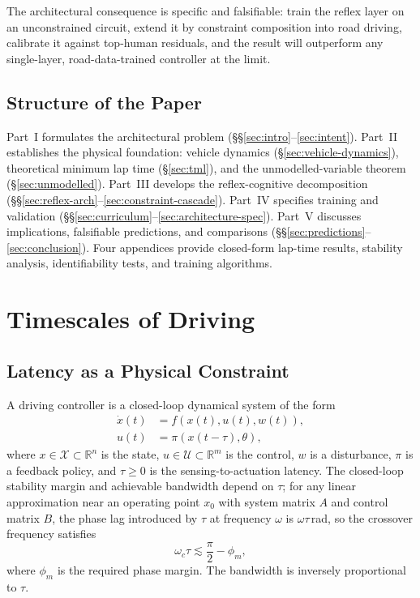 \documentclass[11pt,twocolumn]{article}
\theoremstyle{definition}
\theoremstyle{remark}
\newcommand{\R}{\mathbb{R}}
\providecommand{\cU}{\mathcal{U}}
\providecommand{\cX}{\mathcal{X}}
\begin{document}
\noindent The architectural consequence is specific and falsifiable: train the reflex layer on an unconstrained circuit, extend it by constraint composition into road driving, calibrate it against top-human residuals, and the result will outperform any single-layer, road-data-trained controller at the limit.

\subsection{Structure of the Paper}

Part~I formulates the architectural problem (\S\S\ref{sec:intro}--\ref{sec:intent}). Part~II establishes the physical foundation: vehicle dynamics (\S\ref{sec:vehicle-dynamics}), theoretical minimum lap time (\S\ref{sec:tml}), and the unmodelled-variable theorem (\S\ref{sec:unmodelled}). Part~III develops the reflex-cognitive decomposition (\S\S\ref{sec:reflex-arch}--\ref{sec:constraint-cascade}). Part~IV specifies training and validation (\S\S\ref{sec:curriculum}--\ref{sec:architecture-spec}). Part~V discusses implications, falsifiable predictions, and comparisons (\S\S\ref{sec:predictions}--\ref{sec:conclusion}). Four appendices provide closed-form lap-time results, stability analysis, identifiability tests, and training algorithms.

\section{Timescales of Driving}
\label{sec:timescales}

\subsection{Latency as a Physical Constraint}

A driving controller is a closed-loop dynamical system of the form
\begin{align}
\dot{x}(t) &= f(x(t), u(t), w(t)), \label{eq:dyn}\\
u(t) &= \pi(x(t-\tau), \theta),  \label{eq:ctrl}
\end{align}
where $x \in \cX \subset \R^n$ is the state, $u \in \cU \subset \R^m$ is the control, $w$ is a disturbance, $\pi$ is a feedback policy, and $\tau \ge 0$ is the sensing-to-actuation latency. The closed-loop stability margin and achievable bandwidth depend on $\tau$; for any linear approximation near an operating point $x_0$ with system matrix $A$ and control matrix $B$, the phase lag introduced by $\tau$ at frequency $\omega$ is $\omega\tau$\,rad, so the crossover frequency satisfies \cite{astrom2010feedback}
\begin{equation}
\omega_c \tau \lesssim \frac{\pi}{2} - \phi_m,
\end{equation}
where $\phi_m$ is the required phase margin. The bandwidth is inversely proportional to $\tau$.
\end{document}
